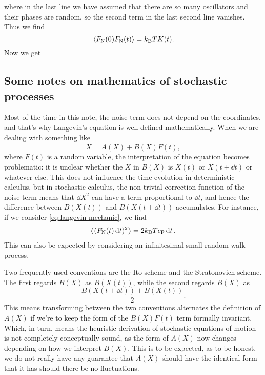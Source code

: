 \documentclass[hyperref, a4paper]{article}
\newcommand*{\kB}{k_{\text{B}}}
\newcommand{\fn}{F_{\text{N}}}
\begin{document}
where in the last line we have assumed that 
there are so many oscillators and their phases are random,
so the second term in the last second line vanishes.
Thus we find 
\begin{equation}
    \expval*{\fn(0) \fn(t)} = \kB T K(t).
\end{equation}
Now we get 

\subsection{Some notes on mathematics of stochastic processes}

Most of the time in this note,
the noise term does not depend on the coordinates,
and that's why Langevin's equation is well-defined mathematically.
When we are dealing with something like 
\begin{equation}
    \dot{X} = A(X) + B(X) F(t),
\end{equation}
where $F(t)$ is a random variable, the interpretation of the equation becomes problematic:
it is unclear whether the $X$ in $B(X)$ is $X(t)$ or $X(t + \dd{t})$ or whatever else.
This does not influence the time evolution in deterministic calculus,
but in stochastic calculus, the non-trivial correction function of the noise term means that 
$\dd{X}^2$ can have a term proportional to $\dd{t}$,
and hence the difference between $B(X(t))$ and $B(X(t + \dd{t}))$ accumulates.
For instance, if we consider \eqref{eq:langevin-mechanic}, we find 
\begin{equation}
    \expval{(F_{\text{N}}(t) \dd{t})^2} = 2 \kB T c_{\text{F}} \dd{t}.
    \label{eq:fdt-sq}
\end{equation}
This can also be expected by considering an infinitesimal small random walk process.

Two frequently used conventions are the Ito scheme and the Stratonovich scheme.
The first regards $B(X)$ as $B(X(t))$,
while the second regards $B(X)$ as 
\[
    \frac{B(X(t + \dd{t})) + B(X(t))}{2}.
\]
This means transforming between the two conventions alternates the definition of $A(X)$ if we're to keep the form of the $B(X) F(t)$ term formally invariant.
Which, in turn, means the heuristic derivation of stochastic equations of motion is not
completely conceptually sound,
as the form of $A(X)$ now changes depending on how we interpret $B(X)$.
This is to be expected, as to be honest,
we do not really have any guarantee that $A(X)$ should have the identical form that it has should there be no fluctuations.
\end{document}
